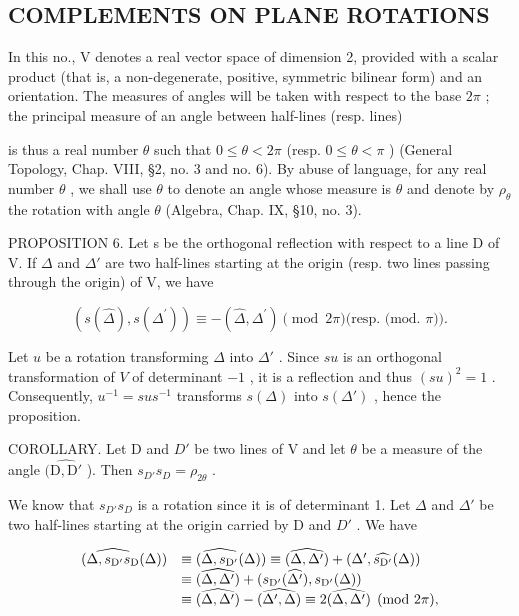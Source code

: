 \subsection{COMPLEMENTS ON PLANE ROTATIONS}

In this no., V denotes a real vector space of dimension 2, provided with a scalar product (that is, a non-degenerate, positive, symmetric bilinear form) and an orientation. The measures of angles will be taken with respect to the base \(2\pi\) ; the principal measure of an angle between half-lines (resp. lines)

is thus a real number \(\theta\) such that \(0 \leqslant \theta < 2\pi\) (resp. \(0 \leqslant \theta < \pi\) ) (General Topology, Chap. VIII, §2, no. 3 and no. 6). By abuse of language, for any real number \(\theta\) , we shall use \(\theta\) to denote an angle whose measure is \(\theta\) and denote by \(\rho_{\theta}\) the rotation with angle \(\theta\) (Algebra, Chap. IX, §10, no. 3).

PROPOSITION 6. Let s be the orthogonal reflection with respect to a line D of V. If \(\Delta\) and \(\Delta'\) are two half-lines starting at the origin (resp. two lines passing through the origin) of V, we have

\[
(s (\widehat {\Delta}), s (\Delta^ {\prime})) \equiv - (\widehat {\Delta}, \Delta^ {\prime}) \pmod {2 \pi} \text {(resp. (mod. } \pi \text {))}.
\]

Let \(u\) be a rotation transforming \(\Delta\) into \(\Delta'\) . Since \(su\) is an orthogonal transformation of \(V\) of determinant \(-1\) , it is a reflection and thus \((su)^2 = 1\) . Consequently, \(u^{-1} = sus^{-1}\) transforms \(s(\Delta)\) into \(s(\Delta')\) , hence the proposition.

COROLLARY. Let D and \(D'\) be two lines of V and let \(\theta\) be a measure of the angle \((\widehat{\mathrm{D},\mathrm{D}'}\) ). Then \(s_{D'}s_{D} = \rho_{2\theta}\) .

We know that \(s_{D'} s_{D}\) is a rotation since it is of determinant 1. Let \(\Delta\) and \(\Delta'\) be two half-lines starting at the origin carried by D and \(D'\) . We have

\[
\begin{array}{r l} (\widehat {\Delta , s _ {\mathrm {D^ {\prime}}} s _ {\mathrm{D}}} (\Delta)) & \equiv (\widehat {\Delta , s _ {\mathrm {D^ {\prime}}}} (\Delta)) \equiv (\widehat {\Delta , \Delta^ {\prime}}) + (\Delta^ {\prime}, \widehat {s _ {\mathrm {D^ {\prime}}}} (\Delta)) \\ & \equiv (\widehat {\Delta , \Delta^ {\prime}}) + (s _ {\mathrm {D^ {\prime}}} (\widehat {\Delta^ {\prime}}), s _ {\mathrm {D^ {\prime}}} (\Delta)) \\ & \equiv (\widehat {\Delta , \Delta^ {\prime}}) - (\widehat {\Delta^ {\prime} , \Delta}) \equiv 2 (\widehat {\Delta , \Delta^ {\prime}}) \pmod {2 \pi}, \end{array}
\]

